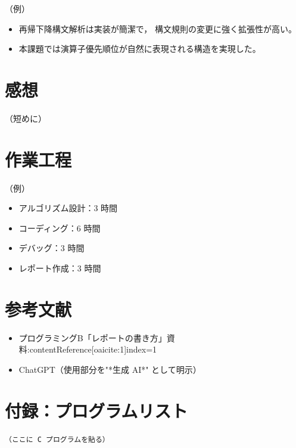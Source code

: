 \documentclass[a4paper,12pt]{jsarticle}
\begin{document}
（例）
\begin{itemize}
    \item 再帰下降構文解析は実装が簡潔で，
    構文規則の変更に強く拡張性が高い。
    \item 本課題では演算子優先順位が自然に表現される構造を実現した。
\end{itemize}

\section{感想}

（短めに）

\section{作業工程}

（例）
\begin{itemize}
    \item アルゴリズム設計：3 時間
    \item コーディング：6 時間
    \item デバッグ：3 時間
    \item レポート作成：3 時間
\end{itemize}

\section{参考文献}

\begin{itemize}
    \item プログラミングB「レポートの書き方」資料:contentReference[oaicite:1]{index=1}
    \item ChatGPT（使用部分を"*生成 AI*" として明示）
\end{itemize}

\appendix
\section*{付録：プログラムリスト}

\begin{verbatim}
（ここに C プログラムを貼る）
\end{verbatim}
\end{document}
